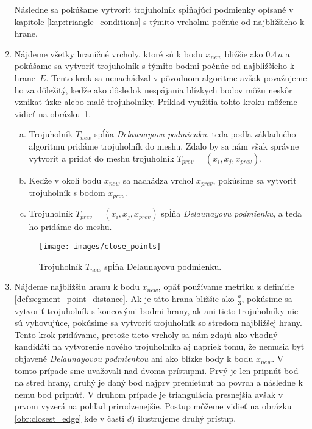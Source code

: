 \begin{enumerate}
{        Následne sa pokúšame vytvoriť trojuholník spĺňajúci podmienky opísané v kapitole 
        \ref{kap:triangle_conditions} s týmito vrcholmi počnúc od najbližšieho k hrane.
    }
    \item{
        Nájdeme všetky hraničné vrcholy, ktoré sú k bodu $x_{new}$ bližšie ako $0.4 \, a$
        a pokúšame sa vytvoriť trojuholník s týmito bodmi počnúc od najbližšieho k \mbox{hrane $E$}. 
        Tento krok sa nenachádzal v pôvodnom algoritme avšak považujeme ho za dôležitý, 
        keďže ako dôsledok nespájania blízkych bodov môžu neskôr vznikať úzke alebo malé trojuholníky. 
        Príklad využitia tohto kroku môžeme vidieť na \newline\mbox{obrázku \ref{obr:close_points}}. 
        \begin{enumerate}[a)]
            \item{
                Trojuholník $T_{new}$ spĺňa \textit{Delaunayovu podmienku}, teda podľa základného 
                algoritmu pridáme trojuholník do meshu. Zdalo by sa nám však správne vytvoriť a 
                pridať do meshu trojuholník $T_{prev} = (x_i, x_j, x_{prev})$. 
            }
            \item{
                Keďže v okolí bodu $x_{new}$ sa nachádza vrchol $x_{prev}$, pokúsime
                sa vytvoriť trojuholník s bodom $x_{prev}.$
            }
            \item{
                Trojuholník $T_{prev} = (x_i, x_j, x_{prev})$ spĺňa \textit{Delaunayovu podmienku},
                a teda ho pridáme do meshu. 
            }
        \end{enumerate}
        
        \begin{figure}
            \centerline{\texttt{[image: images/close\_points]}}
            \caption[Trojuholník spĺňajúci Delaunayovu podmienku]
            {Trojuholník $T_{new}$ spĺňa Delaunayovu podmienku.}
            \label{obr:close_points}
        \end{figure}
    }
    \item{
        Nájdeme najbližšiu hranu k bodu $x_{new}$, opäť používame metriku z definície 
        \ref{def:segment_point_distance}. Ak je táto hrana bližšie ako $\frac{a}{3}$, 
        pokúsime sa vytvoriť trojuholník s koncovými bodmi hrany, ak ani tieto trojuholníky 
        nie sú vyhovujúce, pokúsime sa vytvoriť trojuholník so stredom najbližšej hrany.
        Tento krok pridávame, pretože
        tieto vrcholy sa nám zdajú ako vhodný kandidáti na vytvorenie nového trojuholníka
        aj napriek tomu, že nemusia byť objavené \textit{Delaunayovou podmienkou} ani ako 
        blízke body k bodu $x_{new}$. V tomto prípade sme uvažovali nad dvoma prístupmi. 
        Prvý je len pripnúť 
        bod na stred hrany, druhý je daný bod najprv premietnuť na povrch a následne k nemu bod 
        pripnúť. V druhom prípade je triangulácia presnejšia avšak v prvom vyzerá na pohľad 
        prirodzenejšie. Postup môžeme vidieť na obrázku \ref{obr:closest_edge} kde
        v časti $d)$ ilustrujeme druhý prístup.

}
\end{enumerate}
